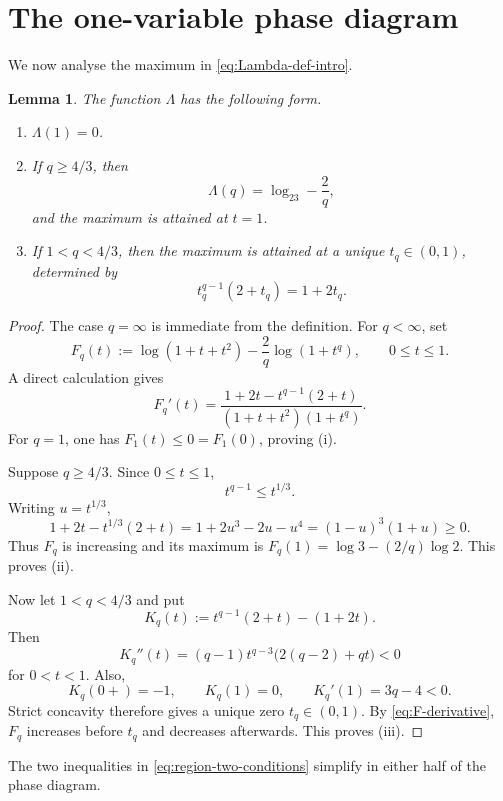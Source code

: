 \documentclass[11pt,reqno]{amsart}
\numberwithin{equation}{section}
\newtheorem{lemma}[lemma]{Lemma}
\theoremstyle{definition}
\theoremstyle{remark}
\newcommand{\Lambdaq}{\Lambda}
\newcommand{\logtwo}{\log_2}
\begin{document}
\section{The one-variable phase diagram}\label{sec:one-variable}

We now analyse the maximum in \eqref{eq:Lambda-def-intro}.

\begin{lemma}\label{lem:Lambda-analysis}
The function $\Lambdaq$ has the following form.
\begin{enumerate}[label=\textup{(\roman*)}]
  \item $\Lambdaq(1)=0$.
  \item If $q\ge4/3$, then
  \[
    \Lambdaq(q)=\logtwo3-\frac2q,
  \]
  and the maximum is attained at $t=1$.
  \item If $1<q<4/3$, then the maximum is attained at a unique $t_q\in(0,1)$, determined by
  \[
    t_q^{q-1}(2+t_q)=1+2t_q.
  \]
\end{enumerate}
\end{lemma}

\begin{proof}
The case $q=\infty$ is immediate from the definition.  For $q<\infty$, set
\[
  F_q(t)
  :=\log(1+t+t^2)-\frac2q\log(1+t^q),
  \qquad 0\le t\le1.
\]
A direct calculation gives
\begin{equation}\label{eq:F-derivative}
  F_q'(t)
  =\frac{1+2t-t^{q-1}(2+t)}
  {(1+t+t^2)(1+t^q)}.
\end{equation}
For $q=1$, one has $F_1(t)\le0=F_1(0)$, proving (i).

Suppose $q\ge4/3$.  Since $0\le t\le1$,
\[
  t^{q-1}\le t^{1/3}.
\]
Writing $u=t^{1/3}$,
\[
  1+2t-t^{1/3}(2+t)
  =1+2u^3-2u-u^4
  =(1-u)^3(1+u)\ge0.
\]
Thus $F_q$ is increasing and its maximum is $F_q(1)=\log3-(2/q)\log2$.  This proves (ii).

Now let $1<q<4/3$ and put
\[
  K_q(t):=t^{q-1}(2+t)-(1+2t).
\]
Then
\begin{equation}\label{eq:K-second}
  K_q''(t)
  =(q-1)t^{q-3}\bigl(2(q-2)+qt\bigr)<0
\end{equation}
for $0<t<1$.  Also,
\[
  K_q(0+)=-1,
  \qquad
  K_q(1)=0,
  \qquad
  K_q'(1)=3q-4<0.
\]
Strict concavity therefore gives a unique zero $t_q\in(0,1)$.  By \eqref{eq:F-derivative}, $F_q$ increases before $t_q$ and decreases afterwards.  This proves (iii).
\end{proof}

The two inequalities in \eqref{eq:region-two-conditions} simplify in either half of the phase diagram.
\end{document}
